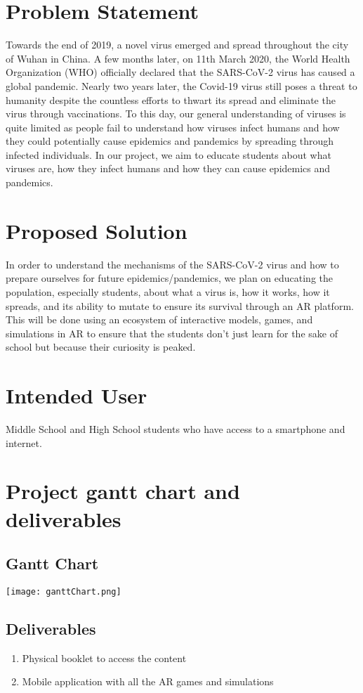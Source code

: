 \section{Problem Statement}
Towards the end of 2019, a novel virus emerged and spread throughout the city of Wuhan in China. A few months later, on 11th March 2020, the World Health Organization (WHO) officially declared that the SARS-CoV-2 virus has caused a global pandemic. Nearly two years later, the Covid-19 virus still poses a threat to humanity despite the countless efforts to thwart its spread and eliminate the virus through vaccinations. To this day, our general understanding of viruses is quite limited as people fail to understand how viruses infect humans and how they could potentially cause epidemics and pandemics by spreading through infected individuals. In our project, we aim to educate students about what viruses are, how they infect humans and how they can cause epidemics and pandemics.

\section{Proposed Solution}
In order to understand the mechanisms of the SARS-CoV-2 virus and how to prepare ourselves for future epidemics/pandemics, we plan on educating the population, especially students, about what a virus is, how it works, how it spreads, and its ability to mutate to ensure its survival through an AR platform. This will be done using an ecosystem of interactive models, games, and simulations in AR to ensure that the students don’t just learn for the sake of school but because their curiosity is peaked.

\section{Intended User}
Middle School and High School students who have access to a smartphone and internet.

\section{Project gantt chart and deliverables}
\subsection{Gantt Chart}
\texttt{[image: ganttChart.png]}

\subsection{Deliverables}
\begin{enumerate}
    \item Physical booklet to access the content 
    \item Mobile application with all the AR games and simulations
\end{enumerate}


